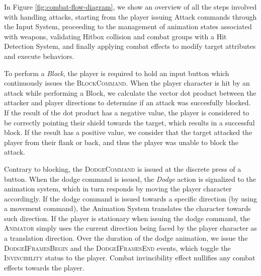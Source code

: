 In Figure \ref{fig:combat-flow-diagram}, we show an overview of all the steps involved with handling attacks, starting from the player issuing Attack commands through the Input System, proceeding to the management of animation states associated with weapons, validating Hitbox collision and combat groups with a Hit Detection System, and finally applying combat effects to modify target attributes and execute behaviors.



To perform a \emph{Block}, the player is required to hold an input button which continuously issues the \textsc{BlockCommand}. When the player character is hit by an attack while performing a Block, we calculate the vector dot product between the attacker and player directions to determine if an attack was succesfully blocked. If the result of the dot product has a negative value, the player is considered to be correctly pointing their shield towards the target, which results in a successful block. If the result has a positive value, we consider that the target attacked the player from their flank or back, and thus the player was unable to block the attack.

Contrary to blocking, the \textsc{DodgeCommand} is issued at the discrete press of a button. When the dodge command is issued, the \emph{Dodge} action is signalized to the animation system, which in turn responds by moving the player character accordingly. If the dodge command is issued towards a specific direction (by using a movement command), the Animation System translates the character towards such direction. If the player is stationary when issuing the dodge command, the \textsc{Animator} simply uses the current direction being faced by the player character as a translation direction. Over the duration of the dodge animation, we issue the \textsc{DodgeIFramesBegin} and the \textsc{DodgeIFramesEnd} events, which toggle the \textsc{Invincibility} status to the player. Combat invincibility effect nullifies any combat effects towards the player.


